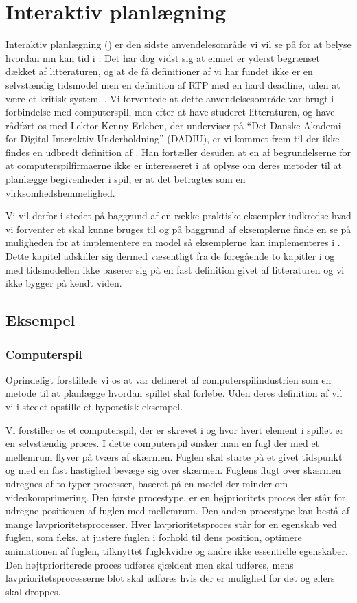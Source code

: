 \chapter{Interaktiv planlægning}
\label{chap:is}

Interaktiv planlægning (\is) er den sidste anvendelesområde vi vil se på for at belyse hvordan mn kan tid i \pycsp. Det har dog vidst sig at emnet er yderst begrænset dækket af litteraturen, og at de få definitioner af \is vi har fundet ikke er en selvstændig tidsmodel men en definition af RTP med en hard deadline, uden at være et kritisk system. \cite{?}. Vi forventede at dette anvendelsesområde var brugt i forbindelse med computerspil, men efter at have studeret litteraturen, og have rådført os med Lektor Kenny Erleben, der underviser på  ``Det Danske Akademi for Digital Interaktiv Underholdning'' (DADIU), er vi kommet frem til der ikke findes en udbredt definition af \is. Han fortæller desuden at en af begrundelserne for at computerspilfirmaerne ikke er interesseret i at oplyse om deres metoder til at planlægge begivenheder i spil, er at det  betragtes som en  virksomhedshemmelighed. 

Vi vil derfor i stedet på baggrund af en række praktiske eksempler indkredse hvad vi forventer et \is skal kunne bruges til og på  baggrund af eksemplerne finde en se på muligheden for at implementere en model så eksemplerne kan implementeres i \pycsp. Dette kapitel adskiller sig dermed væsentligt fra de foregående to kapitler i og med tidsmodellen  ikke baserer sig på en fast definition givet af litteraturen og vi ikke bygger på kendt viden.

\section{Eksempel}

\subsection{Computerspil}
Oprindeligt forstillede vi os at \is var defineret af computerspilindustrien som en metode til at planlægge hvordan spillet skal forløbe. Uden deres definition af \is vil vi i stedet opstille et hypotetisk eksempel. 

Vi forstiller os et computerspil, der er skrevet i \pycsp og hvor hvert element i spillet er en selvstændig proces. I dette computerspil ønsker man en fugl der med et mellemrum flyver på tværs af skærmen. Fuglen skal starte på et givet tidspunkt og med en fast hastighed bevæge sig over skærmen. Fuglens flugt over skærmen udregnes af to typer processer, baseret på en model der minder om videokomprimering. Den første procestype, er en højprioritets proces der står for udregne positionen af fuglen med  mellemrum. Den anden procestype kan bestå af mange lavprioritetsprocesser. Hver lavprioritetsproces står for en egenskab ved fuglen, som  f.eks. at justere fuglen i forhold til dens position, optimere animationen af fuglen, tilknyttet fuglekvidre og andre ikke essentielle egenskaber.  Den højtprioriterede proces udføres sjældent men skal udføres, mens lavprioritetsprocesserne blot skal udføres hvis der er mulighed for det og ellers skal droppes.

